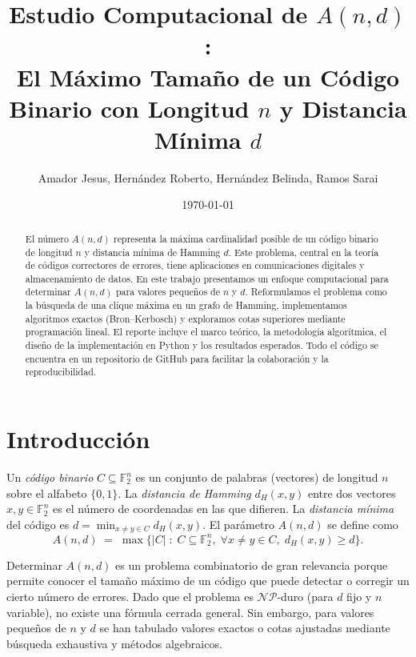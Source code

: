 \documentclass[12pt, spanish]{article}
\title{Estudio Computacional de $A(n,d)$: \\ El Máximo Tamaño de un Código Binario con Longitud $n$ y Distancia Mínima $d$}
\author{Amador Jesus, Hernández Roberto, Hernández Belinda, Ramos Sarai }
\date{\today}
\begin{document}
\maketitle

\begin{abstract}
El número $A(n,d)$ representa la máxima cardinalidad posible de un código binario de longitud $n$ y distancia mínima de Hamming $d$. Este problema, central en la teoría de códigos correctores de errores, tiene aplicaciones en comunicaciones digitales y almacenamiento de datos. En este trabajo presentamos un enfoque computacional para determinar $A(n,d)$ para valores pequeños de $n$ y $d$. Reformulamos el problema como la búsqueda de una clique máxima en un grafo de Hamming, implementamos algoritmos exactos (Bron–Kerbosch) y exploramos cotas superiores mediante programación lineal. El reporte incluye el marco teórico, la metodología algorítmica, el diseño de la implementación en Python y los resultados esperados. Todo el código se encuentra en un repositorio de GitHub para facilitar la colaboración y la reproducibilidad.
\end{abstract}

\section{Introducción}
\label{sec:intro}

Un \textit{código binario} $C \subseteq \mathbb{F}_2^n$ es un conjunto de palabras (vectores) de longitud $n$ sobre el alfabeto $\{0,1\}$. La \textit{distancia de Hamming} $d_H(x,y)$ entre dos vectores $x,y\in\mathbb{F}_2^n$ es el número de coordenadas en las que difieren. La \textit{distancia mínima} del código es $d = \min_{x\neq y\in C} d_H(x,y)$. El parámetro $A(n,d)$ se define como
\[
A(n,d) \;=\; \max\{ |C| \;:\; C\subseteq\mathbb{F}_2^n,\; \forall x\neq y\in C,\; d_H(x,y)\ge d \}.
\]

Determinar $A(n,d)$ es un problema combinatorio de gran relevancia porque permite conocer el tamaño máximo de un código que puede detectar o corregir un cierto número de errores. Dado que el problema es $\mathcal{NP}$-duro (para $d$ fijo y $n$ variable), no existe una fórmula cerrada general. Sin embargo, para valores pequeños de $n$ y $d$ se han tabulado valores exactos o cotas ajustadas mediante búsqueda exhaustiva y métodos algebraicos.
\end{document}
